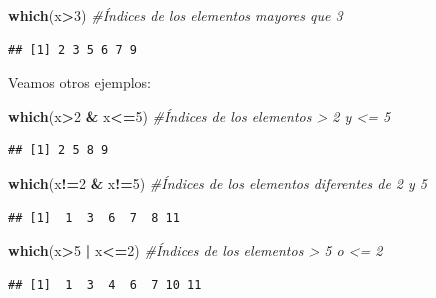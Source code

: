 \documentclass[]{book}
\newenvironment{Shaded}{\begin{snugshade}}{\end{snugshade}}
\newcommand{\CommentTok}[1]{\textcolor[rgb]{0.56,0.35,0.01}{\textit{#1}}}
\newcommand{\DecValTok}[1]{\textcolor[rgb]{0.00,0.00,0.81}{#1}}
\newcommand{\KeywordTok}[1]{\textcolor[rgb]{0.13,0.29,0.53}{\textbf{#1}}}
\newcommand{\NormalTok}[1]{#1}
\newcommand{\OperatorTok}[1]{\textcolor[rgb]{0.81,0.36,0.00}{\textbf{#1}}}
\newcommand{\StringTok}[1]{\textcolor[rgb]{0.31,0.60,0.02}{#1}}
\theoremstyle{definition}
\theoremstyle{definition}
\theoremstyle{definition}
\theoremstyle{remark}
\begin{document}
\begin{Shaded}
\begin{Highlighting}[]
\KeywordTok{which}\NormalTok{(x}\OperatorTok{>}\DecValTok{3}\NormalTok{) }\CommentTok{#Índices de los elementos mayores que 3}
\end{Highlighting}
\end{Shaded}

\begin{verbatim}
## [1] 2 3 5 6 7 9
\end{verbatim}

Veamos otros ejemplos:

\begin{Shaded}
\begin{Highlighting}[]
\KeywordTok{which}\NormalTok{(x}\OperatorTok{>}\DecValTok{2} \OperatorTok{&}\StringTok{ }\NormalTok{x}\OperatorTok{<=}\DecValTok{5}\NormalTok{) }\CommentTok{#Índices de los elementos > 2 y <= 5}
\end{Highlighting}
\end{Shaded}

\begin{verbatim}
## [1] 2 5 8 9
\end{verbatim}

\begin{Shaded}
\begin{Highlighting}[]
\KeywordTok{which}\NormalTok{(x}\OperatorTok{!=}\DecValTok{2} \OperatorTok{&}\StringTok{ }\NormalTok{x}\OperatorTok{!=}\DecValTok{5}\NormalTok{) }\CommentTok{#Índices de los elementos diferentes de 2 y 5}
\end{Highlighting}
\end{Shaded}

\begin{verbatim}
## [1]  1  3  6  7  8 11
\end{verbatim}

\begin{Shaded}
\begin{Highlighting}[]
\KeywordTok{which}\NormalTok{(x}\OperatorTok{>}\DecValTok{5} \OperatorTok{|}\StringTok{ }\NormalTok{x}\OperatorTok{<=}\DecValTok{2}\NormalTok{) }\CommentTok{#Índices de los elementos > 5 o <= 2}
\end{Highlighting}
\end{Shaded}

\begin{verbatim}
## [1]  1  3  4  6  7 10 11
\end{verbatim}

\begin{Shaded}
\end{Shaded}
\end{document}
